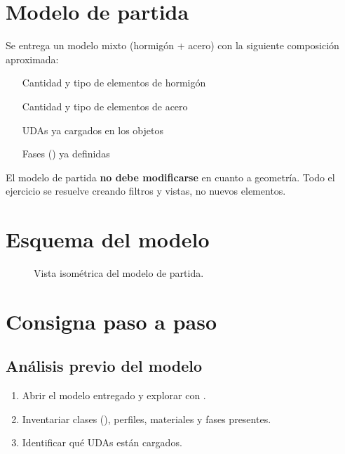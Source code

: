 \documentclass[11pt,a4paper]{article}
\begin{document}
\section{Modelo de partida}
Se entrega un modelo mixto (hormigón + acero) con la siguiente composición aproximada:
\begin{itemize}
    \item [Cantidad y tipo de elementos de hormigón]
    \item [Cantidad y tipo de elementos de acero]
    \item [UDAs ya cargados en los objetos]
    \item [Fases (\tk{Phases}) ya definidas]
\end{itemize}

\begin{advertencia}
El modelo de partida \textbf{no debe modificarse} en cuanto a geometría. Todo el ejercicio se resuelve creando filtros y vistas, no nuevos elementos.
\end{advertencia}

\section{Esquema del modelo}
\begin{figure}[H]
\centering
{}
\caption{Vista isométrica del modelo de partida.}
\end{figure}

\section{Consigna paso a paso}

\subsection{Análisis previo del modelo}
\begin{enumerate}
    \item Abrir el modelo entregado y explorar con \OB.
    \item Inventariar clases (), perfiles, materiales y fases presentes.
    \item Identificar qué UDAs están cargados.
\end{enumerate}
\end{document}
